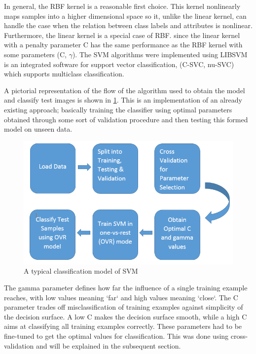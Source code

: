 \documentclass[letterpaper,12pt, onecolumn]{article}%
\begin{document}
In general, the RBF kernel is a reasonable first choice. This kernel nonlinearly maps samples into a higher dimensional space so it, unlike the linear kernel, can handle the case when the relation between class labels and attributes is nonlinear. Furthermore, the linear kernel is a special case of RBF. since the linear kernel with a penalty parameter C has the same performance as the RBF kernel with some parameters (C, $\gamma$). The SVM algorithms were implemented using LIBSVM is an integrated software for support vector classification, (C-SVC, nu-SVC) which supports multiclass classification. 

A pictorial representation of the flow of the algorithm used to obtain the model and classify test images is shown in \cref{fig:svmflow}. This is an implementation of an already existing approach; basically training the classifier using optimal parameters obtained through some sort of validation procedure and then testing this formed model on unseen data.
\begin{figure}[!hbtp]
 	  \centering
 	   \includegraphics[scale=0.6] {fig_svmflow.png} 
 	   \caption{A typical classification model of SVM }
       \label{fig:svmflow}
\end{figure}
The gamma parameter defines how far the influence of a single training example reaches, with low values meaning `far` and high values meaning `close`. The C parameter trades off misclassification of training examples against simplicity of the decision surface. A low C makes the decision surface smooth, while a high C aims at classifying all training examples correctly. 
These parameters had to be fine-tuned to get the optimal values for classification. This was done using cross-validation and will be explained in the subsequent section. 
\end{document}
